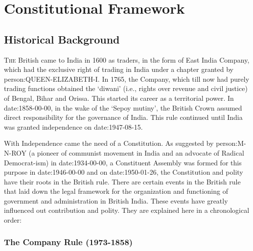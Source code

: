 %

\thispagestyle{empty}
\part{Constitutional Framework}
\restoregeometry
\cleardoublepage

%

\twocolumn

\chapter{Historical Background}

\lettrine[lines=3,nindent=0pt]{T}{he} British came to India in 1600 as traders, in the form of East India Company, which had the exclusive right of trading in India under a chapter granted by \gls{person:QUEEN-ELIZABETH-I}. In 1765, the Company, which till now had purely trading functions obtained the `diwani' (i.e., rights over revenue and civil justice) of Bengal, Bihar and Orissa. This started its career as a territorial power. In \gls{date:1858-00-00}, in the wake of the `Sepoy mutiny', the British Crown assumed direct responsibility for the governance of India. This rule continued until India was granted independence on \gls{date:1947-08-15}.

With Independence came the need of a Constitution. As suggested by \gls{person:M-N-ROY} (a pioneer of communist movement in India and an advocate of Radical Democrat-ism) in \gls{date:1934-00-00}, a Constituent Assembly was formed for this purpose in \gls{date:1946-00-00} and on \gls{date:1950-01-26}, the Constitution and polity have their roots in the British rule. There are certain events in the British rule that laid down the legal framework for the organization and functioning of government and administration in British India. These events have greatly influenced out contribution and polity. They are explained here in a chronological order:

\section{The Company Rule (1973-1858)}


